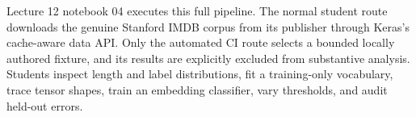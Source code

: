 \begin{notebooklink}
Lecture 12 notebook 04 executes this full pipeline. The normal student route
downloads the genuine Stanford IMDB corpus from its publisher through Keras's
cache-aware data API. Only the automated CI route selects a bounded locally
authored fixture, and its results are explicitly excluded from substantive
analysis. Students inspect length and
label distributions, fit a training-only vocabulary, trace tensor shapes,
train an embedding classifier, vary thresholds, and audit held-out errors.
\end{notebooklink}
